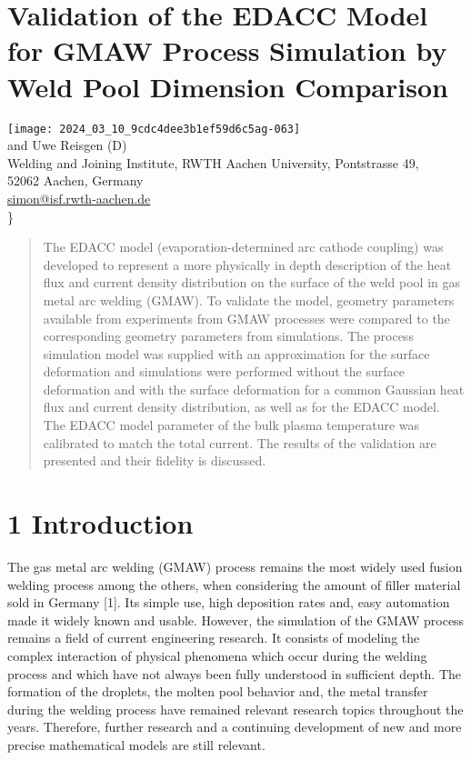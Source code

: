 \documentclass[10pt]{article}
\begin{document}
\section*{Validation of the EDACC Model for GMAW Process Simulation by Weld Pool Dimension Comparison }
\texttt{[image: 2024\_03\_10\_9cdc4dee3b1ef59d6c5ag-063]} \\
 and Uwe Reisgen (D) \\
 Welding and Joining Institute, RWTH Aachen University, Pontstrasse 49, \\
 52062 Aachen, Germany \\
 \href{mailto:simon@isf.rwth-aachen.de}{simon@isf.rwth-aachen.de}\\
\}

\begin{abstract}
The EDACC model (evaporation-determined arc cathode coupling) was developed to represent a more physically in depth description of the heat flux and current density distribution on the surface of the weld pool in gas metal arc welding (GMAW). To validate the model, geometry parameters available from experiments from GMAW processes were compared to the corresponding geometry parameters from simulations. The process simulation model was supplied with an approximation for the surface deformation and simulations were performed without the surface deformation and with the surface deformation for a common Gaussian heat flux and current density distribution, as well as for the EDACC model. The EDACC model parameter of the bulk plasma temperature was calibrated to match the total current. The results of the validation are presented and their fidelity is discussed.
\end{abstract}

\section*{1 Introduction}
The gas metal arc welding (GMAW) process remains the most widely used fusion welding process among the others, when considering the amount of filler material sold in Germany [1]. Its simple use, high deposition rates and, easy automation made it widely known and usable. However, the simulation of the GMAW process remains a field of current engineering research. It consists of modeling the complex interaction of physical phenomena which occur during the welding process and which have not always been fully understood in sufficient depth. The formation of the droplets, the molten pool behavior and, the metal transfer during the welding process have remained relevant research topics throughout the years. Therefore, further research and a continuing development of new and more precise mathematical models are still relevant.
\end{document}
